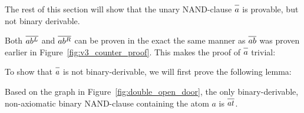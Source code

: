 The rest of this section will show that the unary NAND-clause $\ol{a}$ is provable, but not binary derivable.

Both $\ol{ab^L}$ and $\ol{ab^R}$ can be proven in the exact the same manner as $\ol{ab}$ was proven earlier in Figure~\ref{fig:v3_counter_proof}.
This makes the proof of $\ol{a}$ trivial:\par
\begin{figure}[!h]
  \centering
  \begin{prooftree*}
    \Hypo{\dots}
    \Hypo{\dots}
  \end{prooftree*}
  \caption{}
  \label{fig:unary_nand_proof}
\end{figure}
To show that $\ol{a}$ is not binary-derivable, we will first prove the following lemma:
\begin{lemma}
  Based on the graph in Figure~\ref{fig:double_open_door}, the only binary-derivable, non-axiomatic binary NAND-clause containing the atom $a$ is $\ol{at}$.
\end{lemma}

